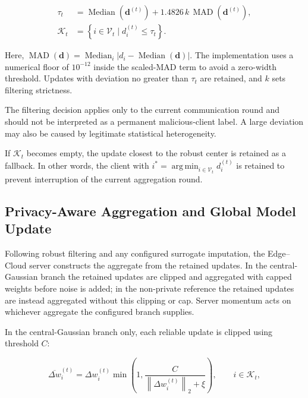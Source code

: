 \documentclass[5p,times,numafflabel]{elsarticle}
\begin{document}
	\begin{equation}
		\begin{aligned}
			\tau_{t}
			&=
			\operatorname{Median}\!\left(\mathbf{d}^{(t)}\right)
			+
			1.4826\,k\,
			\operatorname{MAD}\!\left(\mathbf{d}^{(t)}\right),\\
			\mathcal{K}_{t}
			&=
			\left\{
			i\in\mathcal{V}_{t}
			\mid
			d_{i}^{(t)}\leq\tau_{t}
			\right\}.
		\end{aligned}
		\label{eq:mad-reliable-set}
	\end{equation}
	
	Here, \(\operatorname{MAD}(\mathbf{d})=\operatorname{Median}_i
	|d_i-\operatorname{Median}(\mathbf{d})|\). The implementation
	uses a numerical floor of \(10^{-12}\) inside the scaled-MAD term
	to avoid a zero-width threshold. Updates with deviation no greater
	than \(\tau_t\) are retained, and \(k\) sets filtering strictness.
	
	
	The filtering decision applies only to the current communication
	round and should not be interpreted as a permanent malicious-client
	label. A large deviation may also be caused by legitimate statistical
	heterogeneity.
	
	If \(\mathcal{K}_{t}\) becomes empty, the update closest to the robust
	center is retained as a fallback. In other words, the client with
	\(i^{*}=\operatorname*{arg\,min}_{i\in\mathcal{V}_{t}}d_i^{(t)}\)
	is retained to prevent interruption of the current aggregation round.
	
	\subsection{Privacy-Aware Aggregation and Global Model Update}
	\label{subsec:private-aggregation}
	
Following robust filtering and any configured surrogate imputation,
	the Edge--Cloud server constructs the aggregate from the retained
	updates. In the central-Gaussian branch the retained updates are
clipped and aggregated with capped weights before noise is added;
in the non-private reference the retained updates are instead
aggregated without this clipping or cap. Server momentum acts
on whichever aggregate the configured branch supplies.
	
	In the central-Gaussian branch only, each reliable update is
clipped using threshold \(C\):
	
	\begin{equation}
		\overline{\Delta w}_{i}^{(t)}
		=
		\Delta w_{i}^{(t)}
		\min\left(
		1,
		\frac{C}
		{\left\|\Delta w_{i}^{(t)}\right\|_{2}+\xi}
		\right),
		\qquad i\in\mathcal{K}_{t},
		\label{eq:update-clipping}
	\end{equation}
	
\end{document}

